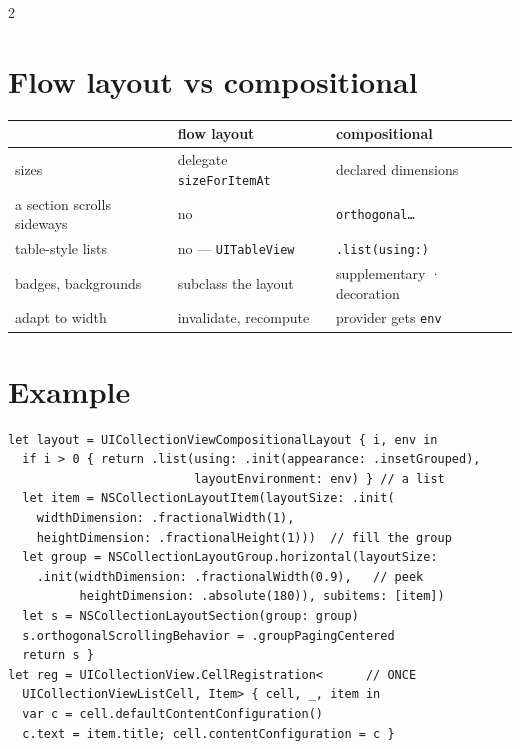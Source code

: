 \documentclass[8pt]{extarticle}
\begin{document}
\begin{multicols}{2}
\section{Flow layout vs compositional}
{\footnotesize
\begin{tabular}{@{}>{\raggedright\arraybackslash}p{20mm}>{\raggedright\arraybackslash}p{25mm}>{\raggedright\arraybackslash}p{28mm}@{}}
\toprule
 & flow layout & compositional \\ \midrule
sizes & delegate \texttt{sizeForItemAt} & declared dimensions \\
a section scrolls sideways & no & \texttt{orthogonal…} \\
table-style lists & no — \texttt{UITableView} & \texttt{.list(using:)} \\
badges, backgrounds & subclass the layout & supplementary · decoration \\
adapt to width & invalidate, recompute & provider gets \texttt{env} \\
\bottomrule
\end{tabular}}

\columnbreak

\section{Example}
\begin{lstlisting}[language=SwiftSheet]
let layout = UICollectionViewCompositionalLayout { i, env in
  if i > 0 { return .list(using: .init(appearance: .insetGrouped),
                          layoutEnvironment: env) } // a list
  let item = NSCollectionLayoutItem(layoutSize: .init(
    widthDimension: .fractionalWidth(1),
    heightDimension: .fractionalHeight(1)))  // fill the group
  let group = NSCollectionLayoutGroup.horizontal(layoutSize:
    .init(widthDimension: .fractionalWidth(0.9),   // peek
          heightDimension: .absolute(180)), subitems: [item])
  let s = NSCollectionLayoutSection(group: group)
  s.orthogonalScrollingBehavior = .groupPagingCentered
  return s }
let reg = UICollectionView.CellRegistration<      // ONCE
  UICollectionViewListCell, Item> { cell, _, item in
  var c = cell.defaultContentConfiguration()
  c.text = item.title; cell.contentConfiguration = c }
\end{lstlisting}


\end{multicols}
\end{document}
